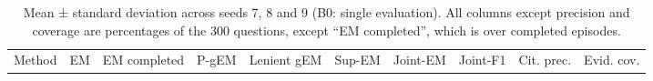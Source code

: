\begin{longtable}[]{@{}
  >{\raggedright\arraybackslash}p{}
  >{\raggedright\arraybackslash}p{}
  >{\raggedright\arraybackslash}p{}
  >{\raggedright\arraybackslash}p{}
  >{\raggedright\arraybackslash}p{}
  >{\raggedright\arraybackslash}p{}
  >{\raggedright\arraybackslash}p{}
  >{\raggedright\arraybackslash}p{}
  >{\raggedright\arraybackslash}p{}
  >{\raggedright\arraybackslash}p{}@{}}
\caption{Mean ± standard deviation across seeds 7, 8 and 9 (B0: single
evaluation). All columns except precision and coverage are percentages
of the 300 questions, except ``EM completed'', which is over completed
episodes.}\label{tbl:4.2}\tabularnewline
\toprule\noalign{}
\begin{minipage}[b]{\linewidth}\raggedright
Method
\end{minipage} & \begin{minipage}[b]{\linewidth}\raggedright
EM
\end{minipage} & \begin{minipage}[b]{\linewidth}\raggedright
EM completed
\end{minipage} & \begin{minipage}[b]{\linewidth}\raggedright
P-gEM
\end{minipage} & \begin{minipage}[b]{\linewidth}\raggedright
Lenient gEM
\end{minipage} & \begin{minipage}[b]{\linewidth}\raggedright
Sup-EM
\end{minipage} & \begin{minipage}[b]{\linewidth}\raggedright
Joint-EM
\end{minipage} & \begin{minipage}[b]{\linewidth}\raggedright
Joint-F1
\end{minipage} & \begin{minipage}[b]{\linewidth}\raggedright
Cit. prec.
\end{minipage} & \begin{minipage}[b]{\linewidth}\raggedright
Evid. cov.
\end{minipage} \\

\end{longtable}
